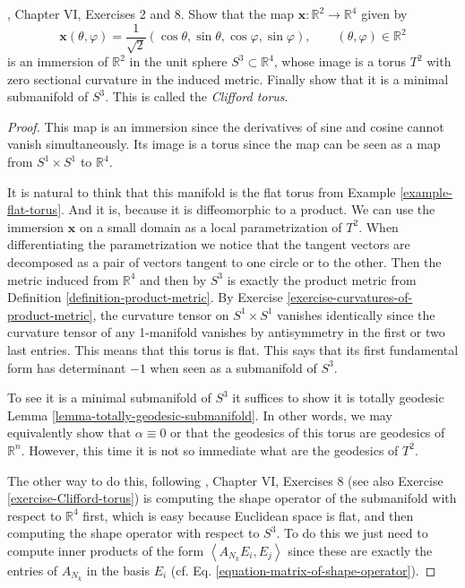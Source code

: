 \begin{exercise}
\label{exercise-Clifford-torus}
\cite{doc}, Chapter VI, Exercises 2 and 8. Show that the map
$\mathbf{x}:\mathbb{R}^2\to\mathbb{R}^4$ given by
$$
\mathbf{x}(\theta,\varphi)
=\frac{1}{\sqrt{2}}(\cos\theta,\sin\theta,\cos\varphi,\sin\varphi),
\qquad(\theta,\varphi)\in\mathbb{R}^2
$$
is an immersion of $\mathbb{R}^2$ in the unit sphere $S^3\subset\mathbb{R}^4$,
whose image is a torus $T^2$ with zero sectional curvature in the induced
metric. Finally show that it is a minimal submanifold of $S^3$. This is called
the {\it Clifford torus}.
\end{exercise}

\begin{proof}
This map is an immersion since the derivatives of sine and cosine cannot vanish
simultaneously. Its image is a torus since the map can be seen as a map
from $S^1\times S^1$ to $\mathbb{R}^4$.

It is natural to think that this manifold is the flat torus from Example
\ref{example-flat-torus}. And it is, because it is diffeomorphic to a product.
We can use the immersion $\mathbf{x}$ on a small domain as a local
parametrization of $T^2$.  When differentiating the parametrization we notice
that the tangent vectors are decomposed as a pair of vectors tangent to one
circle or to the other. Then the metric induced from $\mathbb{R}^4$ and then by
$S^3$ is exactly the product metric from Definition
\ref{definition-product-metric}. By Exercise
\ref{exercise-curvatures-of-product-metric}, the curvature tensor on $S^1\times
S^1$ vanishes identically since the curvature tensor of any 1-manifold vanishes
by antisymmetry in the first or two last entries. This means that this torus is
flat. This says that its first fundamental form has determinant $-1$ when seen
as a submanifold of $S^3$.

To see it is a minimal submanifold of $S^3$ it suffices to show it is totally
geodesic Lemma \ref{lemma-totally-geodesic-submanifold}. In other words, we may
equivalently show that $\alpha\equiv0$ or that the geodesics of this torus are
geodesics of $\mathbb{R}^n$. However, this time it is not so immediate what are
the geodesics of $T^2$.

The other way to do this, following \cite{doc}, Chapter VI, Exercises 8 (see also
Exercise \ref{exercise-Clifford-torus}) is computing the shape operator of the
submanifold with respect to $\mathbb{R}^4$ first, which is easy because
Euclidean space is flat, and then computing the shape operator with respect to
$S^3$. To do this we just need to compute inner products of the form
$\left<A_{N_k}E_i,E_j\right>$ since these are exactly the entries of $A_{N_k}$
in the basis $E_i$ (cf. Eq. \ref{equation-matrix-of-shape-operator}).


\end{proof}
